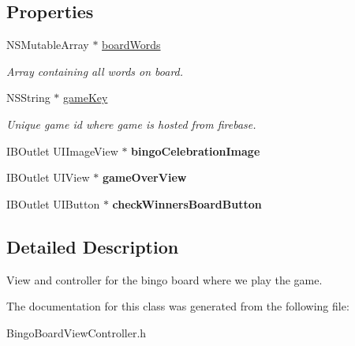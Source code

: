 \subsection*{Properties}
\begin{DoxyCompactItemize}
\item 
\hypertarget{interface_bingo_board_view_controller_a273a683300c3e62e7d67eb59a6e7980b}{N\+S\+Mutable\+Array $\ast$ \hyperlink{interface_bingo_board_view_controller_a273a683300c3e62e7d67eb59a6e7980b}{board\+Words}}\label{interface_bingo_board_view_controller_a273a683300c3e62e7d67eb59a6e7980b}

\begin{DoxyCompactList}\small\item\em Array containing all words on board. \end{DoxyCompactList}\item 
\hypertarget{interface_bingo_board_view_controller_af8b4daa9486d0eb72086a86f65829cdb}{N\+S\+String $\ast$ \hyperlink{interface_bingo_board_view_controller_af8b4daa9486d0eb72086a86f65829cdb}{game\+Key}}\label{interface_bingo_board_view_controller_af8b4daa9486d0eb72086a86f65829cdb}

\begin{DoxyCompactList}\small\item\em Unique game id where game is hosted from firebase. \end{DoxyCompactList}\item 
\hypertarget{interface_bingo_board_view_controller_a7649ecf436718d0c80bd55cec4957784}{I\+B\+Outlet U\+I\+Image\+View $\ast$ {\bfseries bingo\+Celebration\+Image}}\label{interface_bingo_board_view_controller_a7649ecf436718d0c80bd55cec4957784}

\item 
\hypertarget{interface_bingo_board_view_controller_a4ac2e59031229636d0326cd7f40e2ffc}{I\+B\+Outlet U\+I\+View $\ast$ {\bfseries game\+Over\+View}}\label{interface_bingo_board_view_controller_a4ac2e59031229636d0326cd7f40e2ffc}

\item 
\hypertarget{interface_bingo_board_view_controller_a74f72a80d8e332113607f58e61c7454b}{I\+B\+Outlet U\+I\+Button $\ast$ {\bfseries check\+Winners\+Board\+Button}}\label{interface_bingo_board_view_controller_a74f72a80d8e332113607f58e61c7454b}

\end{DoxyCompactItemize}


\subsection{Detailed Description}
View and controller for the bingo board where we play the game. 

The documentation for this class was generated from the following file\+:\begin{DoxyCompactItemize}
\item 
Bingo\+Board\+View\+Controller.\+h\end{DoxyCompactItemize}
